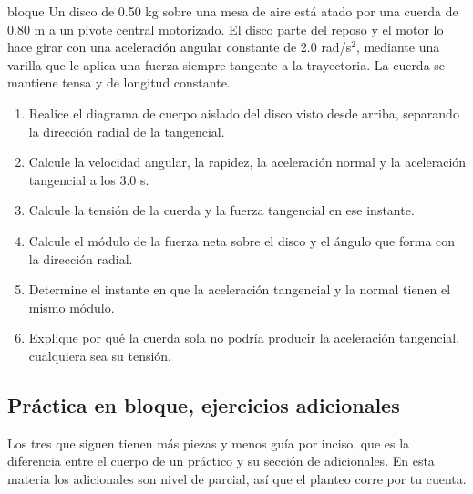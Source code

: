 \documentclass[11pt,openany]{book}
\begin{document}
\begin{ejercicio}{bloque}
Un disco de 0.50 kg sobre una mesa de aire está atado por una cuerda de 0.80 m a un pivote central motorizado. El disco parte del reposo y el motor lo hace girar con una aceleración angular constante de 2.0 rad/s$^2$, mediante una varilla que le aplica una fuerza siempre tangente a la trayectoria. La cuerda se mantiene tensa y de longitud constante.
\begin{enumerate}[label=(\alph*), leftmargin=1.7em, itemsep=1pt, topsep=3pt]
  \item Realice el diagrama de cuerpo aislado del disco visto desde arriba, separando la dirección radial de la tangencial.
  \item Calcule la velocidad angular, la rapidez, la aceleración normal y la aceleración tangencial a los 3.0 s.
  \item Calcule la tensión de la cuerda y la fuerza tangencial en ese instante.
  \item Calcule el módulo de la fuerza neta sobre el disco y el ángulo que forma con la dirección radial.
  \item Determine el instante en que la aceleración tangencial y la normal tienen el mismo módulo.
  \item Explique por qué la cuerda sola no podría producir la aceleración tangencial, cualquiera sea su tensión.
\end{enumerate}
\end{ejercicio}

\subsection{Práctica en bloque, ejercicios adicionales}

Los tres que siguen tienen más piezas y menos guía por inciso, que es la diferencia entre el cuerpo de un práctico y su sección de adicionales. En esta materia los adicionales son nivel de parcial, así que el planteo corre por tu cuenta.
\end{document}
